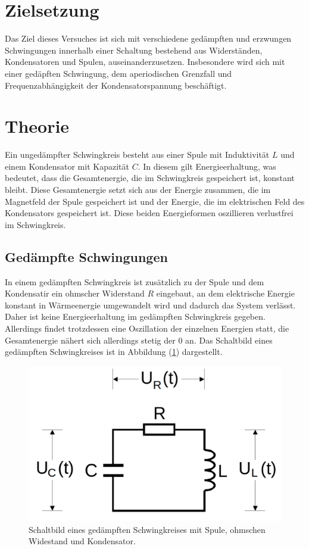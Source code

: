 \section{Zielsetzung}
\label{sec:Zielsetzung}
Das Ziel dieses Versuches ist sich mit verschiedene gedämpften und erzwungen Schwingungen innerhalb einer Schaltung
 bestehend aus Widerständen, Kondensatoren und Spulen, auseinanderzusetzen. Insbesondere wird sich mit einer gedäpften Schwingung, dem aperiodischen 
 Grenzfall und Frequenzabhängigkeit der Kondensatorspannung beschäftigt. 
\section{Theorie}
\label{sec:Theorie}
Ein ungedämpfter Schwingkreis besteht aus einer Spule mit Induktivität $L$ und einem Kondensator mit Kapazität $C$. In diesem gilt Energieerhaltung, was bedeutet, 
dass die Gesamtenergie, die im Schwingkreis gespeichert ist, konstant bleibt. Diese Gesamtenergie setzt sich aus der Energie zusammen, die im Magnetfeld der Spule
gespeichert ist und der Energie, die im elektrischen Feld des Kondensators gespeichert ist. Diese beiden Energieformen oszillieren verlustfrei im Schwingkreis. 

\subsection{Gedämpfte Schwingungen}
In einem gedämpften Schwingkreis ist zusätzlich zu der Spule und dem Kondensatir ein ohmscher Widerstand $R$ eingebaut, an dem elektrische Energie konstant in 
Wärmeenergie umgewandelt wird und dadurch das System verlässt. Daher ist keine Energieerhaltung im gedämpften Schwingkreis gegeben. Allerdings findet trotzdessen eine 
Oszillation der einzelnen Energien statt, die Gesamtenergie nähert sich allerdings stetig der $0$ an. Das Schaltbild eines gedämpften Schwingkreises ist in Abbildung (\ref{pic:Gedaempfter_Schwingkreis})
dargestellt. 
\begin{figure}[H]
    \centering
    \includegraphics[width=0.5\linewidth]{Gedaempfter_Schwingkreis.png}
    \caption{Schaltbild eines gedämpften Schwingkreises mit Spule, ohmschen Widestand und Kondensator.}
    \label{pic:Gedaempfter_Schwingkreis}
\end{figure}

